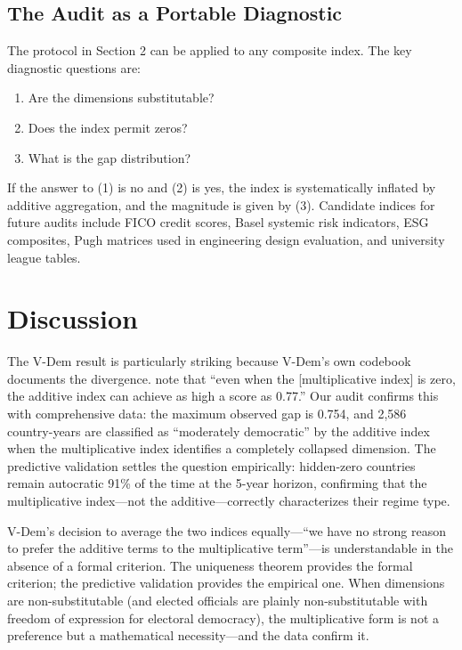 \documentclass[12pt]{article}
\begin{document}
\subsection{The Audit as a Portable Diagnostic}

The protocol in Section 2 can be applied to any composite index. The key diagnostic questions are:
\begin{enumerate}
\item Are the dimensions substitutable?
\item Does the index permit zeros?
\item What is the gap distribution?
\end{enumerate}

If the answer to (1) is no and (2) is yes, the index is systematically inflated by additive aggregation, and the magnitude is given by (3). Candidate indices for future audits include FICO credit scores, Basel systemic risk indicators, ESG composites, Pugh matrices used in engineering design evaluation, and university league tables.


\section{Discussion}

The V-Dem result is particularly striking because V-Dem's own codebook documents the divergence. \citet{coppedge2018} note that ``even when the [multiplicative index] is zero, the additive index can achieve as high a score as 0.77.'' Our audit confirms this with comprehensive data: the maximum observed gap is 0.754, and 2,586 country-years are classified as ``moderately democratic'' by the additive index when the multiplicative index identifies a completely collapsed dimension. The predictive validation settles the question empirically: hidden-zero countries remain autocratic 91\% of the time at the 5-year horizon, confirming that the multiplicative index---not the additive---correctly characterizes their regime type.

V-Dem's decision to average the two indices equally---``we have no strong reason to prefer the additive terms to the multiplicative term''---is understandable in the absence of a formal criterion. The uniqueness theorem provides the formal criterion; the predictive validation provides the empirical one. When dimensions are non-substitutable (and elected officials are plainly non-substitutable with freedom of expression for electoral democracy), the multiplicative form is not a preference but a mathematical necessity---and the data confirm it.
\end{document}

